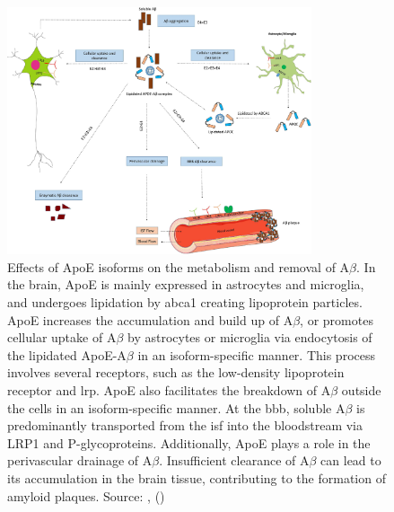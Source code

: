 \documentclass{amsart}
\begin{document}
\begin{figure}[t]
  \includegraphics[width=0.8\textwidth]{figures/ApoEeffectsB.jpg}
    \caption{Effects of ApoE isoforms on the metabolism and removal of A$\beta$. In the brain, ApoE is mainly expressed in astrocytes and microglia, and undergoes lipidation by \acrfull{abca1} creating lipoprotein particles. ApoE increases the accumulation and build up of A$\beta$, or promotes cellular uptake of A$\beta$ by astrocytes or microglia via endocytosis of the lipidated ApoE-A$\beta$ in an isoform-specific manner. This process involves several receptors, such as the low-density lipoprotein receptor and \acrfull{lrp}. ApoE also facilitates the breakdown of A$\beta$ outside the cells in an isoform-specific manner. At the \acrlong{bbb}, soluble A$\beta$ is predominantly transported from the \acrfull{isf} into the bloodstream via LRP1 and P-glycoproteins. Additionally, ApoE plays a role in the perivascular drainage of A$\beta$. Insufficient clearance of A$\beta$ can lead to its accumulation in the brain tissue, contributing to the formation of amyloid plaques. Source: ,  (\citeyear{Husain2021APOETherapeutics}) \cite{Husain2021APOETherapeutics}}
  \label{ApoeEffectsA}
\end{figure}
\end{document}
